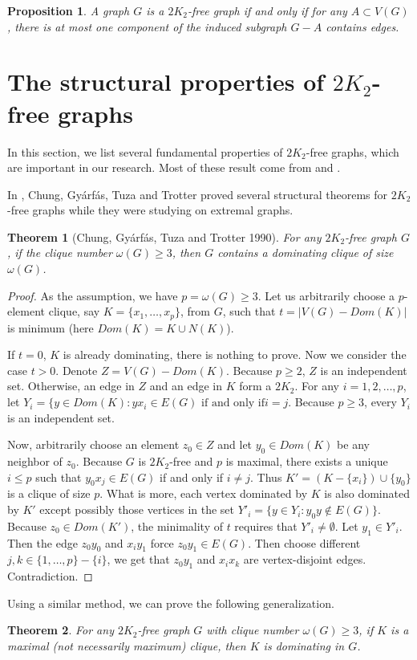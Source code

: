 \documentclass[12pt]{report}
\newtheorem{theorem}{Theorem}
\newtheorem{proposition}{Proposition}
\begin{document}
\begin{proposition}\label{ob1inbro14}
A graph $G$ is a $2K_2$-free graph if and only if for any $A\subset V(G)$, there is at most one component of the induced subgraph $G-A$ contains edges.
\end{proposition}
\section{The structural properties of $2K_2$-free graphs}
In this section, we list several fundamental properties of $2K_2$-free graphs, which are important in our research. Most of these result come from \cite{chung1990maximum} and \cite{broersma2014toughness}.


In \cite{chung1990maximum}, Chung, Gy{\'a}rf{\'a}s, Tuza and Trotter proved several structural theorems for $2K_2$-free graphs while they were studying on extremal graphs.

\begin{theorem}[Chung, Gy{\'a}rf{\'a}s, Tuza and Trotter 1990]\label{str2k2thm1chu90}
For any $2K_2$-free graph $G$, if the clique number $\omega(G)\ge3$, then $G$ contains a dominating clique of size $\omega(G)$.
\end{theorem}

\begin{proof}
As the assumption, we have $p=\omega(G)\ge3$. Let us arbitrarily choose a $p$-element clique, say $K=\{x_1,\ldots,x_p\}$, from $G$, such that $t=|V(G)-Dom(K)|$ is minimum (here $Dom(K)=K\cup N(K)$).

If $t=0$, $K$ is already dominating, there is nothing to prove. Now we consider the case $t>0$. Denote $Z=V(G)-Dom(K)$. Because $p\ge2$, $Z$ is an independent set. Otherwise, an edge in $Z$ and an edge in $K$ form a $2K_2$. For any $i=1,2,\ldots,p$, let $Y_i=\{y\in Dom(K):yx_i\in E(G)\text{ if and only if}i=j$. Because $p\ge3$, every $Y_i$ is an independent set.

Now, arbitrarily choose an element $z_0\in Z$ and let $y_0\in Dom(K)$ be any neighbor of $z_0$. Because $G$ is $2K_2$-free and $p$ is maximal, there exists a unique $i\le p$ such that $y_0x_j\in E(G)$ if and only if $i\neq j$. Thus $K'=(K-\{x_i\})\cup\{y_0\}$ is a clique of size $p$. What is more, each vertex dominated by $K$ is also dominated by $K'$ except possibly those vertices in the set $Y'_i=\{y\in Y_i:y_0y\not\in E(G)\}$. Because $z_0\in Dom(K')$, the minimality of $t$ requires that $Y'_i\neq\emptyset$. Let $y_1\in Y'_i$. Then the edge $z_0y_0$ and $x_iy_1$  force $z_0y_1\in E(G)$. Then choose different $j,k\in\{1,\ldots,p\}-\{i\}$, we get that $z_0y_1$ and $x_ix_k$ are vertex-disjoint edges. Contradiction.
\end{proof}
Using a similar method, we can prove the following generalization.
\begin{theorem}\label{thmcormaldomclitrf}
For any $2K_2$-free graph $G$ with clique number $\omega(G)\ge3$, if $K$ is a maximal (not necessarily maximum) clique, then $K$ is dominating in $G$.
\end{theorem}
\end{document}
